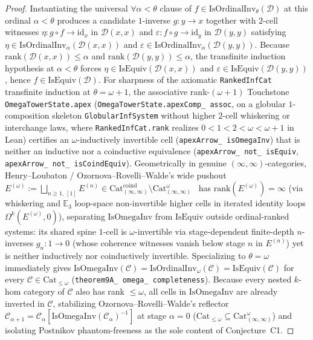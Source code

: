 \begin{proof}
Instantiating the universal $\forall \alpha < \theta$ clause of $f \in \mathrm{IsOrdinalInv}_\theta(\mathcal{D})$ at this ordinal $\alpha < \theta$ produces a candidate $1$-inverse $g : y \to x$ together with $2$-cell witnesses $\eta : g \circ f \to \mathrm{id}_x$ in $\mathcal{D}(x, x)$ and $\varepsilon : f \circ g \to \mathrm{id}_y$ in $\mathcal{D}(y, y)$ satisfying $\eta \in \mathrm{IsOrdinalInv}_\alpha(\mathcal{D}(x, x))$ and $\varepsilon \in \mathrm{IsOrdinalInv}_\alpha(\mathcal{D}(y, y))$. Because $\mathrm{rank}(\mathcal{D}(x, x)) \le \alpha$ and $\mathrm{rank}(\mathcal{D}(y, y)) \le \alpha$, the transfinite induction hypothesis at $\alpha < \theta$ forces $\eta \in \mathrm{IsEquiv}(\mathcal{D}(x, x))$ and $\varepsilon \in \mathrm{IsEquiv}(\mathcal{D}(y, y))$, hence $f \in \mathrm{IsEquiv}(\mathcal{D})$. For sharpness of the axiomatic \texttt{RankedInfCat} transfinite induction at $\theta = \omega + 1$, the associative rank-$(\omega + 1)$ Touchstone \texttt{OmegaTowerState.apex} (\texttt{OmegaTowerState.apexComp\_ assoc}, on a globular $1$-composition skeleton \texttt{GlobularInfSystem} without higher $2$-cell whiskering or interchange laws, where \texttt{RankedInfCat.rank} realizes $0 < 1 < 2 < \omega < \omega + 1$ in Lean) certifies an $\omega$-inductively invertible cell (\texttt{apexArrow\_ isOmegaInv}) that is neither an inductive nor a coinductive equivalence (\texttt{apexArrow\_ not\_ isEquiv}, \texttt{apexArrow\_ not\_ isCoindEquiv}). Geometrically in genuine $(\infty, \infty)$-categories, Henry--Loubaton / Ozornova--Rovelli--Walde's wide pushout $E^{(\omega)} := \bigsqcup_{n \ge 1,\, [1]} E^{(n)} \in \mathrm{Cat}^{\mathrm{coind}}_{(\infty, \infty)} \setminus \mathrm{Cat}^\omega_{(\infty, \infty)}$~\cite{HenryLoubaton25,ORW26} has $\mathrm{rank}(E^{(\omega)}) = \infty$ (via whiskering and $\mathbb{E}_3$ loop-space non-invertible higher cells in iterated identity loops $\Omega^k(E^{(\omega)}, 0)$), separating $\mathrm{IsOmegaInv}$ from $\mathrm{IsEquiv}$ outside ordinal-ranked systems: its shared spine $1$-cell is $\omega$-invertible via stage-dependent finite-depth $n$-inverses $g_n : 1 \to 0$ (whose coherence witnesses vanish below stage $n$ in $E^{(n)}$) yet is neither inductively nor coinductively invertible. Specializing to $\theta = \omega$ immediately gives $\mathrm{IsOmegaInv}(\mathcal{C}) = \mathrm{IsOrdinalInv}_\omega(\mathcal{C}) = \mathrm{IsEquiv}(\mathcal{C})$ for every $\mathcal{C} \in \mathrm{Cat}_{\le \omega}$ (\texttt{theorem9A\_ omega\_ completeness}). Because every nested $k$-hom category of $\mathcal{C}$ also has rank $\le \omega$, all cells in $\mathrm{IsOmegaInv}$ are already inverted in $\mathcal{C}$, stabilizing Ozornova--Rovelli--Walde's reflector $\mathcal{C}_{\alpha+1} = \mathcal{C}_\alpha[\mathrm{IsOmegaInv}(\mathcal{C}_\alpha)^{-1}]$ at stage $\alpha = 0$ ($\mathrm{Cat}_{\le \omega} \subseteq \mathrm{Cat}^\omega_{(\infty, \infty)}$) and isolating Postnikov phantom-freeness as the sole content of Conjecture~C1.
\end{proof}

